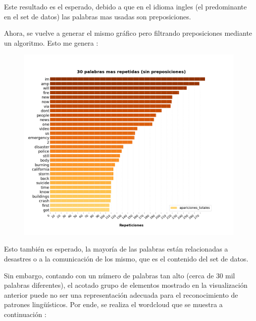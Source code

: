\documentclass[titlepage,a4paper]{article}
\begin{document}
    Este resultado es el esperado, debido a que en el idioma ingles (el predominante en el set de datos) las palabras mas usadas son preposiciones.
    
    Ahora, se vuelve a generar el mismo gráfico pero filtrando preposiciones mediante un algoritmo. Esto me genera :
    
    \begin{figure}[H]
    \centering
    \includegraphics[width=1\textwidth]{graficos/Analisis Lexico Grafico/30masRepetidasFiltrado.png}
    \caption{}  
    \end{figure}
    
    Esto también es esperado, la mayoría de las palabras están relacionadas a desastres o a la comunicación de los mismo, que es el contenido del set de datos.
    
    Sin embargo, contando con un número de palabras tan alto (cerca de 30 mil palabras diferentes), el acotado grupo de elementos mostrado en la visualización anterior puede no ser una representación adecuada para el reconocimiento de patrones lingüísticos. Por ende, se realiza el wordcloud que se muestra a continuación :
    
\end{document}
